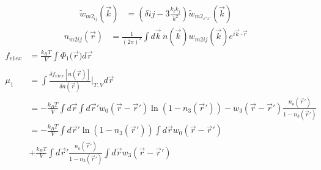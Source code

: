 \documentclass[double,12pt]{beavtex}
\begin{document}
\begin{align}
    \widetilde{w}_{m2_{ij}}(\vec{k}) &= (\delta{ij}-3\frac{k_ik_j}{k^2})
                                    \widetilde{w}_{{m2}_{x'x'}}(\vec{k})
\end{align}
\begin{align}
    n_{m2ij}(\vec r) &=  \frac{1}{\left(2\pi\right)^3}\int d\vec k\, 
                       n(\vec k) w_{m2ij}(\vec k)e^{i\vec k\cdot \vec r}
\end{align} 
\begin{align}
    f_{v1ex} &= \frac{k_BT}{V}\int \Phi_1(\vec{r}{) d}\vec{r}  \\ \nonumber\\
    \mu_1 &= \int \frac{\delta f_{v1ex}[n(\vec r)]}{\delta n(\vec r)}\bigg|_{T,V} d\vec{r} \\
          &= -\frac{k_BT}{V} \int d\vec r \int d \vec r' w_0(\vec r - \vec r')
              \ln(1-n_3(\vec r')) - w_3(\vec r - \vec r')\frac{n_o(\vec r')}{1-n_3(\vec r')} \\
          &= -\frac{k_BT}{V} \int d\vec r' \ln(1-n_3(\vec r')) \int d \vec r  w_0(\vec r - \vec r') \\
          &+ \frac{k_BT}{V} \int d\vec r' \frac{n_o(\vec r')}{1-n_3(\vec r')} \int d \vec r  w_3(\vec r - \vec r')
\end{align}

\end{document}
